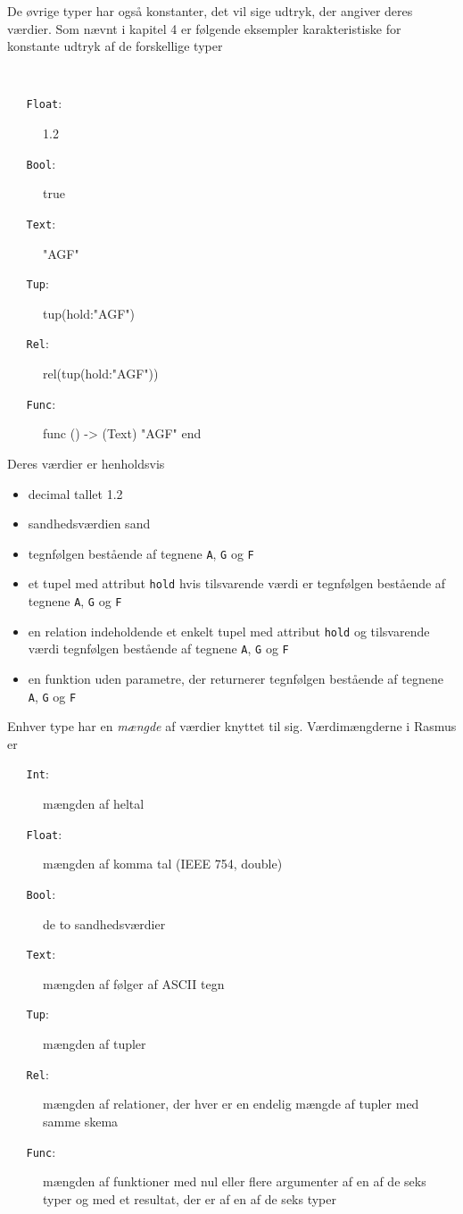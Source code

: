\documentclass{article}
\newcounter{eks}
\begin{document}
De \o{}vrige typer har ogs\aa{} konstanter, det vil sige udtryk,
der angiver deres v\ae{}rdier. Som n\ae{}vnt i kapitel 4 er
f\o{}lgende eksempler karakteristiske for konstante udtryk af de
forskellige typer
{\tt
  \begin{description}%
  \item[{\tt ~~~Float}:] 1.2
\item[{\tt ~~~Bool}:] true 
\item[{\tt ~~~Text}:] "AGF"
\item[{\tt ~~~Tup}:] tup(hold:"AGF")
\item[{\tt ~~~Rel}:] rel(tup(hold:"AGF"))
\item[{\tt ~~~Func}:] func () -> (Text) "AGF" end
\end{description}
}
Deres v\ae{}rdier er henholdsvis
\begin{itemize}
\item decimal tallet 1.2
\item sandhedsv\ae{}rdien sand
\item tegnf\o{}lgen best\aa{}ende af tegnene \verb"A", \verb"G" og \verb"F"
\item et tupel med attribut \verb"hold" hvis tilsvar\-en\-de v\ae{}rdi er
tegnf\o{}lgen best\aa{}\-en\-de af tegnene \verb"A", \verb"G" og \verb"F"
\item en relation indeholdende et enkelt tupel med attribut \verb"hold" og
til\-svar\-en\-de v\ae{}rdi
tegnf\o{}lgen best\aa{}ende af tegnene \verb"A", \verb"G" og \verb"F"
\item en funktion uden parametre, der returnerer tegnf\o{}lgen best\aa{}\-en\-de 
af tegnene \verb"A", \verb"G" og \verb"F"
\end{itemize}
Enhver type har en {\em m\ae{}ngde\/} af v\ae{}rdier knyttet til sig.
V\ae{}rdim\ae{}ngderne i {\sc Rasmus} er
\begin{description}%
\item[{\tt ~~~Int}:] m\ae{}ngden af heltal
\item[{\tt ~~~Float}:] m\ae{}ngden af komma tal (IEEE 754, double)
\item[{\tt ~~~Bool}:] de to sandhedsv\ae{}rdier
\item[{\tt ~~~Text}:] m\ae{}ngden af f\o{}lger af ASCII tegn
\item[{\tt ~~~Tup}:] m\ae{}ngden af tupler
\item[{\tt ~~~Rel}:] m\ae{}ngden af relationer, der hver er en endelig
m\ae{}ngde af tupler med samme skema
\item[{\tt ~~~Func}:] m\ae{}ngden af funktioner med nul eller flere
argumenter af en af de seks typer og med et resultat, der er af en af de seks
typer
\end{description}
\end{document}
